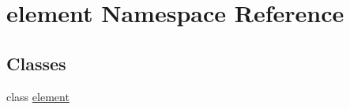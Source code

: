 \hypertarget{namespaceelement}{
\section{element Namespace Reference}
\label{namespaceelement}
}
\subsection*{Classes}
\begin{DoxyCompactItemize}
\item 
class \hyperlink{classelement_1_1element}{element}
\end{DoxyCompactItemize}
